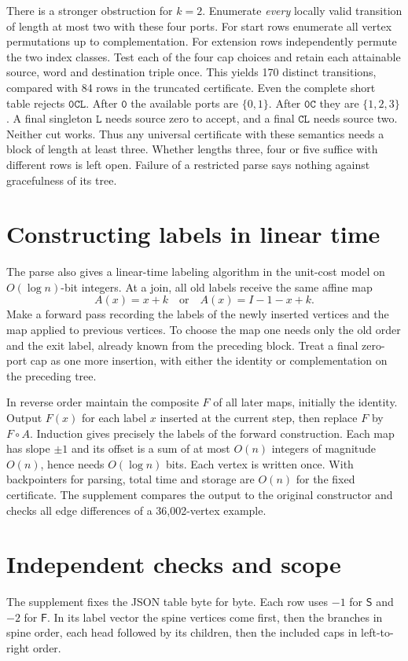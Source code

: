 \documentclass[11pt,a4paper]{article}
\newcommand{\start}{\mathsf S}
\newcommand{\finish}{\mathsf F}
\newcommand{\word}[1]{\mathtt{#1}}
\begin{document}
There is a stronger obstruction for $k=2$. Enumerate \emph{every} locally valid transition of length at most two with these four ports. For start rows enumerate all vertex permutations up to complementation. For extension rows independently permute the two index classes. Test each of the four cap choices and retain each attainable source, word and destination triple once. This yields 170 distinct transitions, compared with 84 rows in the truncated certificate. Even the complete short table rejects $\word{0CL}$. After $\word0$ the available ports are $\{0,1\}$. After $\word{0C}$ they are $\{1,2,3\}$. A final singleton $\word L$ needs source zero to accept, and a final $\word{CL}$ needs source two. Neither cut works. Thus any universal certificate with these semantics needs a block of length at least three. Whether lengths three, four or five suffice with different rows is left open. Failure of a restricted parse says nothing against gracefulness of its tree.

\section{Constructing labels in linear time}
The parse also gives a linear-time labeling algorithm in the unit-cost model on $O(\log n)$-bit integers. At a join, all old labels receive the same affine map
\[
 A(x)=x+k\quad\text{or}\quad A(x)=I-1-x+k .
\]
Make a forward pass recording the labels of the newly inserted vertices and the map applied to previous vertices. To choose the map one needs only the old order and the exit label, already known from the preceding block. Treat a final zero-port cap as one more insertion, with either the identity or complementation on the preceding tree.

In reverse order maintain the composite $F$ of all later maps, initially the identity. Output $F(x)$ for each label $x$ inserted at the current step, then replace $F$ by $F\circ A$. Induction gives precisely the labels of the forward construction. Each map has slope $\pm1$ and its offset is a sum of at most $O(n)$ integers of magnitude $O(n)$, hence needs $O(\log n)$ bits. Each vertex is written once. With backpointers for parsing, total time and storage are $O(n)$ for the fixed certificate. The supplement compares the output to the original constructor and checks all edge differences of a 36,002-vertex example.

\newpage
\section{Independent checks and scope}
The supplement fixes the JSON table byte for byte. Each row uses $-1$ for $\start$ and $-2$ for $\finish$. In its label vector the spine vertices come first, then the branches in spine order, each head followed by its children, then the included caps in left-to-right order.
\end{document}
